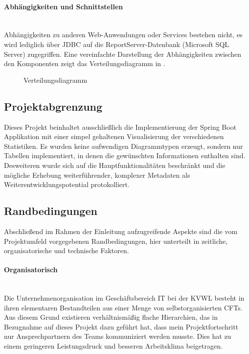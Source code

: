 \paragraph{Abhängigkeiten und Schnittstellen} ~\\
\label{p:Abhaengigkeiten}
Abhängigkeiten zu anderen Web-Anwendungen oder Services bestehen nicht, es wird lediglich über \ac{JDBC} auf die ReportServer-Datenbank (Microsoft SQL Server) zugegriffen. Eine vereinfachte Darstellung der Abhängigkeiten zwischen den Komponenten zeigt das Verteilungsdiagramm in .
\begin{figure}[htb]
	\centering
	\caption{Verteilungsdiagramm}
	\label{fig:Deployment}
\end{figure} 

\subsection{Projektabgrenzung} 
\label{sec:Projektabgrenzung}
Dieses Projekt beinhaltet ausschließlich die Implementierung der Spring Boot Applikation mit einer simpel gehaltenen Visualisierung der verschiedenen Statistiken. Es wurden keine aufwendigen Diagrammtypen erzeugt, sondern nur Tabellen implementiert, in denen die gewünschten Informationen enthalten sind.
Desweiteren wurde sich auf die Hauptfunktionalitäten beschränkt und die mögliche Erhebung weiterführender, komplexer Metadaten als Weiterentwicklungspotential protokolliert.

\subsection{Randbedingungen} 
\label{sec:Randbedingungen}
Abschließend im Rahmen der Einleitung aufzugreifende Aspekte sind die vom Projektumfeld vorgegebenen Randbedingungen, hier unterteilt in zeitliche, organisatorische und technische Faktoren.

\paragraph{Organisatorisch} ~\\
\label{p:Randbedingungen:Organisatorisch}
Die Unternehmenorganisation im Geschäftsbereich IT bei der \ac{KVWL} besteht in ihren elementaren Bestandteilen aus einer Menge von selbstorganisierten \ac{CFT}s. Aus diesem Grund existieren verhältnismäßig flache Hierarchien, das in Bezugnahme auf dieses Projekt dazu geführt hat, dass mein Projektfortschritt nur Ansprechpartnern des Teams kommuniziert werden musste. Dies hat zu einem geringeren Leistungsdruck und besseren Arbeitsklima beigetragen.

